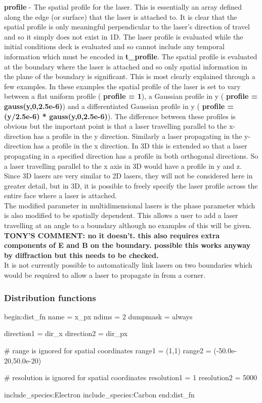 \documentclass[12pt,a4paper]{article}
\newcommand{\emphtext}{\color{warwickdark} \fontfamily{phv}\selectfont\large\bf}
\newcommand{\inlineemph}[1]{{\color{warwicklight} \bf{#1}}}
\newcommand{\tony}[1]{{\color{warwickred} \bf{TONY'S COMMENT:} \bf{#1}}\\}
\newenvironment{nbboxverbatim}[1]{
\noindent\minipage{\textwidth}
\setlength{\FrameSep}{0pt}
\def\FrameCommand{\fboxsep=0pt \colorbox{shadecolor}}
\MakeFramed{\FrameRestore}
\fvset{label=#1}
\boxverb
}{
\endboxverb
\vspace{-13.5pt}
\endMakeFramed
\endminipage
\vspace{5pt}
}
\begin{document}
{\emphtext profile} - The spatial profile for the laser. This is
essentially an array defined along the edge (or surface) that the laser is
attached to. It is clear that the spatial profile is only meaningful
perpendicular to the laser's direction of travel and so it simply does not
exist in 1D. The laser profile is evaluated while the initial conditions deck
is evaluated and so cannot include any temporal information which must be
encoded in \inlineemph{t\_profile}.  The spatial profile is evaluated at the
boundary where the laser is attached and so only spatial information in the
plane of the boundary is significant. This is most clearly explained through a
few examples. In these examples the spatial profile of the laser is set to vary
between a flat uniform profile (\inlineemph{profile = 1}), a Gaussian profile in
y (\inlineemph{profile = gauss(y,0,2.5e-6)}) and a differentiated Gaussian
profile in y (\inlineemph{profile = (y/2.5e-6) * gauss(y,0,2.5e-6)}). The
difference between these profiles is obvious but the important point is that a
laser travelling parallel to the x-direction has a profile in the y
direction. Similarly a laser propagating in the y-direction has a profile in
the x direction. In 3D this is extended so that a laser propagating in a
specified direction has a profile in both orthogonal directions. So a laser
travelling parallel to the x axis in 3D would have a profile in y and z. Since
3D lasers are very similar to 2D lasers, they will not be considered here in
greater detail, but in 3D, it is possible to freely specify the laser profile
across the entire face where a laser is attached.\\

The modified parameter in
multidimensional lasers is the phase parameter which is also modified to
be spatially dependent. This allows a user to add a laser travelling at an
angle to a boundary although no examples of this will be given.
\tony{no it doesn't. this also requires extra components of E and B on
the boundary. possible this works anyway by diffraction but this needs to be
checked.}
It is not
currently possible to automatically link lasers on two boundaries which
would be required to allow a laser to propagate in from a corner.\\

\subsubsection{Distribution functions}
%
\begin{nbboxverbatim}{dist\_fn block}
begin:dist_fn
   name = x_px
   ndims = 2
   dumpmask = always

   direction1 = dir_x
   direction2 = dir_px

   # range is ignored for spatial coordinates
   range1 = (1,1)
   range2 = (-50.0e-20,50.0e-20)

   # resolution is ignored for spatial coordinates
   resolution1 = 1
   resolution2 = 5000

   include_species:Electron
   include_species:Carbon
end:dist_fn
\end{nbboxverbatim}
\end{document}
